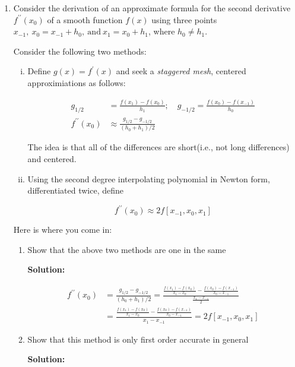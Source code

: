 \documentclass[12pt]{article}
\newcommand{\pprime}{\prime \prime}
\begin{document}
\begin{enumerate}
\newpage

\item Consider the derivation of an approximate formula for the second derivative $f^{\prime \prime}(x_{0})$ of a smooth function $f(x)$ using three points $x_{-1},\ x_{0}=x_{-1} + h_{0},\ \text{and}\ x_{1}=x_{0}+h_{1}$, where $h_{0} \neq h_{1}$. 

Consider the following two methods:

\begin{enumerate}[i.]
\item Define $g(x) = f^{\prime}(x)$ and seek a {\em staggered mesh}, centered approximiations as follows:

\begin{align*}
g_{1/2} &= \frac{f(x_{1}) - f(x_{0})}{h_{1}};\quad g_{-1/2} = \frac{f(x_{0}) - f(x_{-1})}{h_{0}}\\
f^{\prime \prime}(x_{0}) &\approx \frac{g_{1/2} - g_{-1/2}}{(h_{0} + h_{1})/2}
\end{align*}

The idea is that all of the differences are short(i.e., not long differences) and centered.

\item Using the second degree interpolating polynomial in Newton form, differentiated twice, define

\[
f^{\prime \prime}(x_{0}) \approx 2f[x_{-1}, x_{0}, x_{1}]
\]

\end{enumerate}

Here is where you come in:

\begin{enumerate}
\item Show that the above two methods are one in the same

{\bf Solution:}

\begin{align*}
f^{\pprime}(x_{0}) &= \frac{g_{1/2} - g_{-1/2}}{(h_{0} + h_{1})/2} = \frac{\frac{f(x_{1}) - f(x_{0})}{x_{1} - x_{0}} - \frac{f(x_{0}) - f(x_{-1})}{x_{0} - x_{-1}}}{\frac{x_{1} - x_{-1}}{2}}\\
&= \frac{\frac{f(x_{1}) - f(x_{0})}{x_{1} - x_{0}} - \frac{f(x_{0}) - f(x_{-1})}{x_{0} - x_{-1}}}{x_{1} - x_{-1}} = 2f[x_{-1}, x_{0}, x_{1}]
\end{align*}

\item Show that this method is only first order accurate in general

{\bf Solution:}


\end{enumerate}
\end{enumerate}
\end{document}
